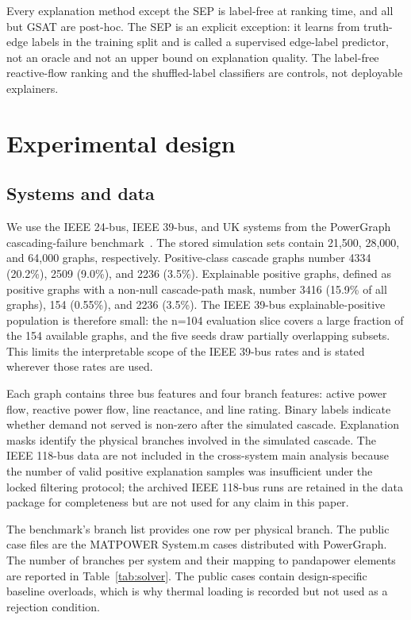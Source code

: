 Every explanation method except the SEP is label-free at ranking time, and all but GSAT are post-hoc. The SEP is an explicit exception: it learns from truth-edge labels in the training split and is called a supervised edge-label predictor, not an oracle and not an upper bound on explanation quality. The label-free reactive-flow ranking and the shuffled-label classifiers are controls, not deployable explainers.

\section{Experimental design}\label{experimental_design}

\subsection{Systems and data}\label{systems_and_data}

We use the IEEE 24-bus, IEEE 39-bus, and UK systems from the PowerGraph cascading-failure benchmark~\citep{varbella2024,varbella2023}. The stored simulation sets contain 21{,}500, 28{,}000, and 64{,}000 graphs, respectively. Positive-class cascade graphs number 4334 (20.2\%), 2509 (9.0\%), and 2236 (3.5\%). Explainable positive graphs, defined as positive graphs with a non-null cascade-path mask, number 3416 (15.9\% of all graphs), 154 (0.55\%), and 2236 (3.5\%). The IEEE 39-bus explainable-positive population is therefore small: the n=104 evaluation slice covers a large fraction of the 154 available graphs, and the five seeds draw partially overlapping subsets. This limits the interpretable scope of the IEEE 39-bus rates and is stated wherever those rates are used.

Each graph contains three bus features and four branch features: active power flow, reactive power flow, line reactance, and line rating. Binary labels indicate whether demand not served is non-zero after the simulated cascade. Explanation masks identify the physical branches involved in the simulated cascade. The IEEE 118-bus data are not included in the cross-system main analysis because the number of valid positive explanation samples was insufficient under the locked filtering protocol; the archived IEEE 118-bus runs are retained in the data package for completeness but are not used for any claim in this paper.

The benchmark's branch list provides one row per physical branch. The public case files are the MATPOWER System.m cases distributed with PowerGraph. The number of branches per system and their mapping to pandapower elements are reported in Table~\ref{tab:solver}. The public cases contain design-specific baseline overloads, which is why thermal loading is recorded but not used as a rejection condition.

